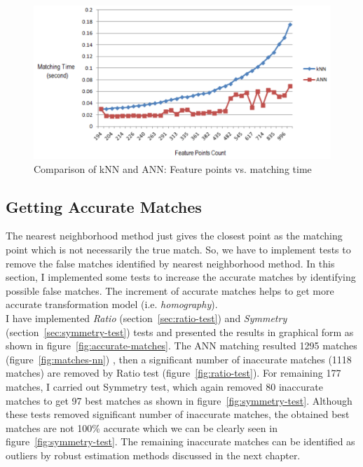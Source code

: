 \begin{figure}[H]%
\centering
\includegraphics[width=1.3\columnwidth]{2.mainmatter/2.Methodology/figures/kNN-ANN}%
\caption[Comparison of kNN and ANN]{Comparison of kNN and ANN: Feature points vs. matching time}%
\label{fig:knn-ann}%
\end{figure}

\subsection{Getting Accurate Matches}
\label{sec:accurate-matches}
The nearest neighborhood method just gives the closest point as the matching point which is not necessarily the true match. So, we have to implement tests to remove the false matches identified by nearest neighborhood method. In this section, I implemented some tests to increase the accurate matches by identifying possible false matches. The increment of accurate matches helps to get more accurate transformation model (i.e. \emph{homography}).\\ 

\noindent I have implemented \emph{Ratio} (section~\ref{sec:ratio-test}) and \emph{Symmetry} (section~\ref{sec:symmetry-test}) tests and presented the results in graphical form as shown in figure~\ref{fig:accurate-matches}. The ANN matching resulted 1295 matches (figure~\ref{fig:matches-nn}) , then a significant number of inaccurate matches (1118 matches) are removed by Ratio test (figure~\ref{fig:ratio-test}). For remaining 177 matches, I carried out Symmetry test, which again removed 80 inaccurate matches to get 97 best matches as shown in figure~\ref{fig:symmetry-test}. Although these tests removed significant number of inaccurate matches, the obtained best matches are not 100\% accurate which we can be clearly seen in figure~\ref{fig:symmetry-test}. The remaining inaccurate matches can be identified as outliers by robust estimation methods discussed in the next chapter.


